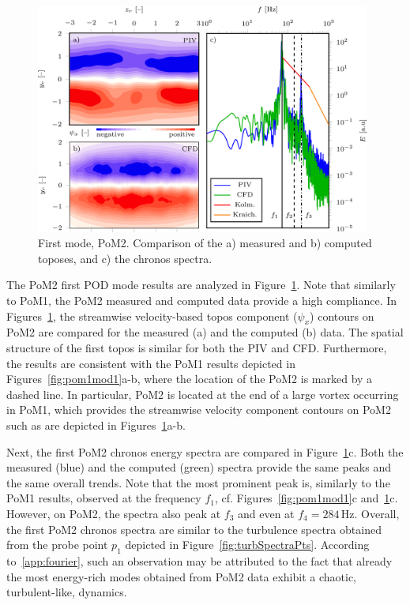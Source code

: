 \begin{figure}[htpb]
    \centering
    \includegraphics[width=0.98\textwidth]{02_images/00_export/figure12.png}
    \caption{{First mode, PoM2.} Comparison of the a) measured and b) computed toposes, and c) the chronos spectra.}
    \label{fig:pom2mod1}
\end{figure}
The PoM2 first POD mode results are analyzed in Figure~\ref{fig:pom2mod1}. Note that {similarly to PoM1,} the PoM2 measured and computed data provide {a} high compliance. In Figures~\ref{fig:pom2mod1}, the streamwise {velocity-based topos} component ($\psi_x$) contours on PoM2 are compared for the measured (a) and the computed (b) data. The spatial structure of the first topos is similar for both {the} PIV and CFD. Furthermore, the results are consistent with the PoM1 results depicted in Figures~\ref{fig:pom1mod1}a-b, where the location of the PoM2 is marked by {a} dashed line. In particular, PoM2 is located at the end of {a} large vortex occurring in PoM1, which provides the streamwise velocity component contours on PoM2 such as are depicted in Figures~\ref{fig:pom2mod1}a-b.

Next, the first PoM2 chronos energy spectra are compared in Figure~\ref{fig:pom2mod1}c. Both {the} measured {(blue)} and the computed {(green)} spectra provide the same peaks {and the same overall trends}. Note that the {most prominent} peak is, similarly {to} {the} PoM1 {results,} observed at {the} frequency $f_1$, {cf. Figures~\ref{fig:pom1mod1}c and~\ref{fig:pom2mod1}c}. However, on PoM2{, the} spectra also peak at $f_3$ and {even at} $f_4=284\,$Hz. Overall, the first PoM2 chronos spectra are similar to the turbulence spectra {obtained from the probe point $p_{1}$} depicted in Figure~\ref{fig:turbSpectraPts}. {According to~\ref{app:fourier}, such an observation may be attributed to the fact that already the most energy-rich modes obtained from PoM2 data exhibit a chaotic, turbulent-like, dynamics.}


